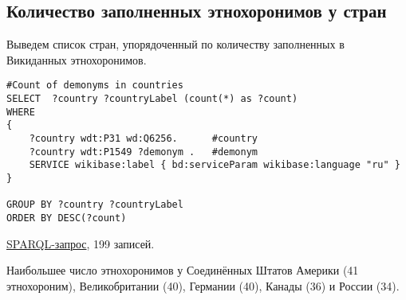 \subsection{Количество заполненных этнохоронимов у стран}

Выведем список стран, упорядоченный по количеству заполненных в Викиданных этнохоронимов.

\begin{lstlisting}[language=SPARQL]
#Count of demonyms in countries
SELECT  ?country ?countryLabel (count(*) as ?count)
WHERE
{
	?country wdt:P31 wd:Q6256.      #country
	?country wdt:P1549 ?demonym .   #demonym
	SERVICE wikibase:label { bd:serviceParam wikibase:language "ru" }
}

GROUP BY ?country ?countryLabel 
ORDER BY DESC(?count)
\end{lstlisting}

\href{https://query.wikidata.org/#%23Count%20of%20demonyms%20in%20countries%0ASELECT%20%20%3Fcountry%20%3FcountryLabel%20%28count%28%2a%29%20as%20%3Fcount%29%0AWHERE%0A%7B%0A%09%3Fcountry%20wdt%3AP31%20wd%3AQ6256.%20%20%20%20%20%20%23country%0A%09%3Fcountry%20wdt%3AP1549%20%3Fdemonym%20.%20%20%20%23demonym%0A%09SERVICE%20wikibase%3Alabel%20%7B%20bd%3AserviceParam%20wikibase%3Alanguage%20%22ru%22%20%7D%0A%7D%0A%0AGROUP%20BY%20%3Fcountry%20%3FcountryLabel%20%0AORDER%20BY%20DESC%28%3Fcount%29%0A}{SPARQL-запрос}, 199 записей. 

Наибольшее число этнохоронимов у Соединённых Штатов Америки (41 этнохороним), Великобритании (40), Германии (40), Канады (36) и России (34).
